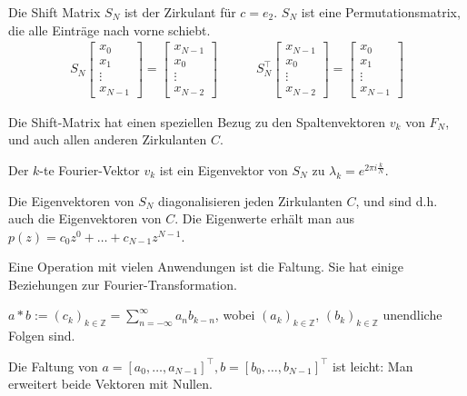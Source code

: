 Die Shift Matrix $S_N$ ist der Zirkulant für $c=e_2$. $S_N$ ist eine Permutationsmatrix, die alle Einträge nach vorne schiebt.
\begin{align*}
    S_N \begin{bmatrix}
        x_0 \\
        x_1 \\
        \vdots \\
        x_{N-1}
    \end{bmatrix}
    =
    \begin{bmatrix}
        x_{N-1} \\
        x_0 \\
        \vdots \\
        x_{N-2}
    \end{bmatrix}
    \quad \quad \quad 
    S_N^\top \begin{bmatrix}
        x_{N-1} \\
        x_0 \\
        \vdots \\
        x_{N-2}
    \end{bmatrix}
    =
    \begin{bmatrix}
        x_0 \\
        x_1 \\
        \vdots \\
        x_{N-1}
    \end{bmatrix}
\end{align*}

Die Shift-Matrix hat einen speziellen Bezug zu den Spaltenvektoren $v_k$ von $F_N$, und auch allen anderen Zirkulanten $C$.

\inlineremark Der $k$-te Fourier-Vektor $v_k$ ist ein Eigenvektor von $S_N$ zu $\lambda_k = e^{2\pi i \frac{k}{N}}$.

 Die Eigenvektoren von $S_N$ diagonalisieren jeden Zirkulanten $C$, und sind d.h. auch die Eigenvektoren von $C$.
Die Eigenwerte erhält man aus $p(z) = c_0z^0 + \ldots + c_{N-1}z^{N-1}$.

Eine Operation mit vielen Anwendungen ist die Faltung. Sie hat einige Beziehungen zur Fourier-Transformation.

 $a * b := (c_k)_{k \in \mathbb{Z}} = \displaystyle\sum_{n=-\infty}^{\infty}a_nb_{k-n}$, wobei $(a_k)_{k \in \mathbb{Z}}$, $(b_k)_{k \in \mathbb{Z}}$ unendliche Folgen sind.

Die Faltung von $a = [a_0,\ldots,a_{N-1}]^\top, b = [b_0,\ldots,b_{N-1}]^\top$ ist leicht: Man erweitert beide Vektoren mit Nullen.

